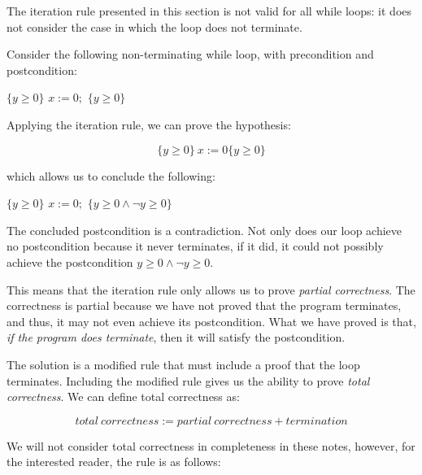The iteration rule presented in this section is not valid for all while loops: it does not consider the case in which the loop does not terminate. 

\begin{example}
Consider the following non-terminating while loop, with precondition and postcondition:

\begin{algorithmic}[0]
\State $\{y \geq 0\}$
  \State $x := 0;$
\EndWhile
\State $\{y \geq 0\}$
\end{algorithmic}

Applying the iteration rule, we can prove the hypothesis:

\begin{displaymath}
\{y \geq 0 \} ~x := 0 \{ y \geq 0 \}
\end{displaymath}

which allows us to conclude the following:

\begin{algorithmic}[0]
\State $\{y \geq 0\}$
  \State $x := 0;$
\EndWhile
\State $\{y \geq 0 \land \neg y \geq 0\}$
\end{algorithmic}

The concluded postcondition is a contradiction. Not only does our loop achieve no postcondition because it never terminates, if it did, it could not possibly achieve the postcondition $y \geq 0 \land \neg y \geq 0$.

\end{example}

This means that the iteration rule only allows us to prove \emph{partial correctness}. The correctness is partial because we have not proved that the program terminates, and thus, it may not even achieve its postcondition. What we have proved is that, \emph{if the program does terminate}, then it will satisfy the postcondition.

The solution is a modified rule that must include a proof that the loop terminates. Including the modified rule gives us the ability to prove \emph{total correctness}. We can define total correctness as:

\begin{displaymath}
 total~correctness := partial~correctness + termination
\end{displaymath}

We will not consider total correctness in completeness in these notes, however, for the interested reader, the rule is as follows:

